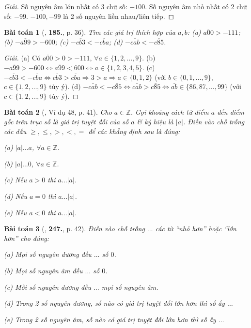 \documentclass{article}
\numberwithin{equation}{section}
\newtheorem{baitoan}{Bài toán}
\begin{document}
\begin{proof}[Giải]
	Số nguyên âm lớn nhất có $3$ chữ số: $-100$. Số nguyên âm nhỏ nhất có $2$ chữ số: $-99$. $-100,-99$ là 2 số nguyên liền nhau\texttt{/}liên tiếp.
\end{proof}

\begin{baitoan}[\cite{Tuyen_Toan_6}, \textbf{185.}, p. 36]
	Tìm các giá trị thích hợp của $a,b$: (a) $\overline{a00} > -111$; (b) $-\overline{a99} > -600$; (c) $-\overline{cb3} < -\overline{cba}$; (d) $-\overline{cab} < -\overline{c85}$.
\end{baitoan}

\begin{proof}[Giải]
	(a) Có $\overline{a00} > 0 > -111$, $\forall a\in\{1,2,\ldots,9\}$. (b) $-\overline{a99} > -600\Leftrightarrow\overline{a99} < 600\Leftrightarrow a\in\{1,2,3,4,5\}$. (c) $-\overline{cb3} < -\overline{cba}\Leftrightarrow\overline{cb3} > \overline{cba}\Rightarrow 3 > a\Rightarrow a\in\{0,1,2\}$ (với $b\in\{0,1,\ldots,9\}$, $c\in\{1,2,\ldots,9\}$ tùy ý). (d) $-\overline{cab} < -\overline{c85}\Leftrightarrow\overline{cab} > \overline{c85}\Leftrightarrow\overline{ab}\in\{86,87,\ldots,99\}$ (với $c\in\{1,2,\ldots,9\}$ tùy ý).
\end{proof}

\begin{baitoan}[\cite{Binh_Toan_6_tap_1}, Ví dụ 48, p. 41]
	Cho $a\in\mathbb{Z}$. Gọi khoảng cách từ điểm $a$ đến điểm gốc trên trục số là \emph{giá trị tuyệt đối} của số $a$ \& ký hiệu là $|a|$. Điền vào chỗ trống các dấu $\ge,\le,>,<,=$ để các khẳng định sau là đúng:
	\begin{enumerate*}
		\item[(a)] $|a|\ldots a$, $\forall a\in\mathbb{Z}$.
		\item[(b)] $|a|\ldots 0$, $\forall a\in\mathbb{Z}$.
		\item[(c)] Nếu $a > 0$ thì $a\ldots|a|$.
		\item[(d)] Nếu $a = 0$ thì $a\ldots|a|$.
		\item[(e)] Nếu $a < 0$ thì $a\ldots|a|$.
	\end{enumerate*}
\end{baitoan}

\begin{baitoan}[\cite{Binh_Toan_6_tap_1}, \textbf{247.}, p. 42]
	Điền vào chỗ trống $\ldots$ các từ ``nhỏ hơn'' hoặc ``lớn hơn'' cho đúng:
	\begin{enumerate*}
		\item[(a)] Mọi số nguyên dương đều $\ldots$ số $0$.
		\item[(b)] Mọi số nguyên âm đều $\ldots$ số $0$.
		\item[(c)] Mỗi số nguyên dương đều $\ldots$ mọi số nguyên âm.
		\item[(d)] Trong 2 số nguyên dương, số nào có giá trị tuyệt đối lớn hơn thì số ấy $\ldots$
		\item[(e)] Trong 2 số nguyên âm, số nào có giá trị tuyệt đối lớn hơn thì số ấy $\ldots$
	\end{enumerate*}
\end{baitoan}
\end{document}
